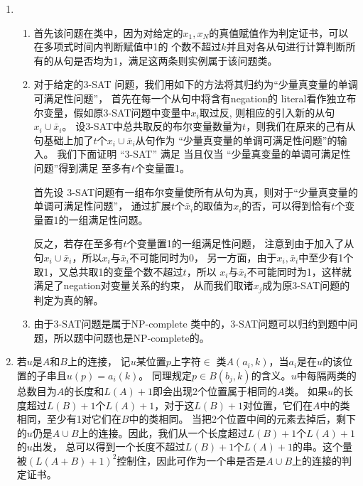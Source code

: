 \documentclass[a4paper]{article}
\begin{document}
\begin{enumerate}[label=\arabic*.]
  \setlength{\itemsep}{3\parskip}
  \setcounter{enumi}{5}
  \item 
    \begin{enumerate}[label=(\alph*)]
    \item 首先该问题在\NP 类中，因为对给定的$x_1,x_N$的真值赋值作为判定证书，可以在多项式时间内判断赋值中1的
    个数不超过$k$并且对各从句进行计算判断所有的从句是否均为1，满足这两条则实例属于该问题类。
    
    \item 对于给定的3-SAT 问题，我们用如下的方法将其归约为“少量真变量的单调可满足性问题”，
    首先在每一个从句中将含有negation的
    literal看作独立布尔变量，假如原3-SAT问题中变量中$x_i$取过反,
    则相应的引入新的从句$x_i\cup \bar{x}_i$。
    设3-SAT中总共取反的布尔变量数量为$t$，则我们在原来的己有从句基础上加了$t$个$x_i\cup \bar{x}_i$从句作为
    “少量真变量的单调可满足性问题”的输入。
    我们下面证明
    “3-SAT” 满足 当且仅当
    “少量真变量的单调可满足性问题”得到满足
    至多有$t$个变量置1。
    
    首先设
    3-SAT问题有一组布尔变量使所有从句为真，则对于“少量真变量的单调可满足性问题”，
    通过扩展$t$个$\bar{x}_i$的取值为$x_i$的否，可以得到恰有$t$个变量置1的一组满足性问题。
    
    
    反之，若存在至多有$t$个变量置1的一组满足性问题，
    注意到由于加入了从句$x_i\cup \bar{x}_i$，所以$x_i$与$\bar{x}_i$不可能同时为0，
    另一方面，由于$x_i,\bar{x}_i$中至少有1个取1，又总共取1的变量个数不超过$t$，所以
    $x_i$与$\bar{x}_i$不可能同时为1，这样就满足了negation对变量关系的约束，
    从而我们取诸$x_j$成为原3-SAT问题的判定为真的解。
    \item 由于3-SAT问题是属于NP-complete 类中的，3-SAT问题可以归约到题中问题，所以题中问题也是NP-complete的。
    \end{enumerate}
  \setcounter{enumi}{22}    
  \item 若$u$是$A$和$B$上的连接，
  记$u$某位置$p$上字符$\in$ 类$A(a_i,k)$，当$a_i$是在$u$的该位置的子串且$u(p)=a_i(k)$。
  同理规定$p\in B(b_j,k)$的含义。$u$中每隔两类的总数目为$A$的长度和$L(A)+1$即会出现2个位置属于相同的$A$类。
  如果$u$的长度超过$L(B)+1$个$L(A)+1$，对于这$L(B)+1$对位置，它们在$A$中的类相同，至少有1对它们在$B$中的类相同。
  当把2个位置中间的元素去掉后，剩下的$u$仍是$A\cup B$上的连接。因此，我们从一个长度超过$L(B)+1$个$L(A)+1$的$u$出发，
  总可以得到一个长度不超过$L(B)+1$个$L(A)+1$的串。这个量被$(L(A+B)+1)^2$控制住，因此可作为一个串是否是$A\cup B$上的连接的判定证书。
\end{enumerate}
\end{document}
